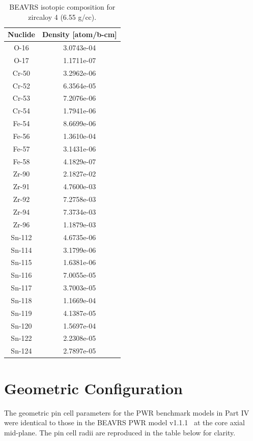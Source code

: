 \begin{appendices}
\begin{table}[h!]
  \centering
  \caption[BEAVRS isotopic composition for zircaloy]{BEAVRS isotopic composition for zircaloy 4 (6.55 g/cc).}
  \footnotesize
  \label{table:chap7-beavrs-isotopes-3.1-zircaloy}
  \vspace{6pt}
  \begin{tabular}{c c}
  \toprule
  \rowcolor{lightgray}
  {\bf Nuclide} &
  {\bf Density [atom/b-cm]} \\
  \midrule
  O-16 & 3.0743e-04 \\
  O-17 & 1.1711e-07 \\
  Cr-50 & 3.2962e-06 \\
  Cr-52 & 6.3564e-05 \\
  Cr-53 & 7.2076e-06 \\
  Cr-54 & 1.7941e-06 \\
  Fe-54 & 8.6699e-06 \\
  Fe-56 & 1.3610e-04 \\
  Fe-57 & 3.1431e-06 \\
  Fe-58 & 4.1829e-07 \\
  Zr-90 & 2.1827e-02 \\
  Zr-91 & 4.7600e-03 \\
  Zr-92 & 7.2758e-03 \\
  Zr-94 & 7.3734e-03 \\
  Zr-96 & 1.1879e-03 \\
  Sn-112 & 4.6735e-06 \\
  Sn-114 & 3.1799e-06 \\
  Sn-115 & 1.6381e-06 \\
  Sn-116 & 7.0055e-05 \\
  Sn-117 & 3.7003e-05 \\
  Sn-118 & 1.1669e-04 \\
  Sn-119 & 4.1387e-05 \\
  Sn-120 & 1.5697e-04 \\
  Sn-122 & 2.2308e-05 \\
  Sn-124 & 2.7897e-05 \\
  \bottomrule
\end{tabular}
\end{table}


\section{Geometric Configuration}
\label{sec:beavrs-geometry}

The geometric pin cell parameters for the \ac{PWR} benchmark models in Part IV were identical to those in the \ac{BEAVRS} \ac{PWR} model v1.1.1~\cite{horelik2013beavrs} at the core axial mid-plane. The pin cell radii are reproduced in the table below for clarity.


\end{appendices}
